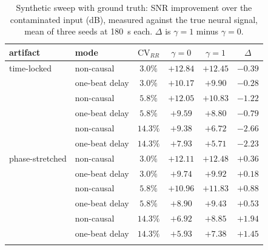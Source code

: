 \begin{table}[!ht]
\centering
\small
\caption{Synthetic sweep with ground truth: SNR improvement over the contaminated input
(dB), measured against the true neural signal, mean of three seeds at 180~s each.
$\Delta$ is $\gamma{=}1$ minus $\gamma{=}0$.}
\label{tab:synth}
\begin{tabular}{@{}llcccc@{}}
\toprule
artifact & mode & $\mathrm{CV}_{RR}$ & $\gamma{=}0$ & $\gamma{=}1$ & $\Delta$ \\
\midrule
time-locked & non-causal & $3.0\%$ & $+12.84$ & $+12.45$ & $-0.39$ \\
 & one-beat delay & $3.0\%$ & $+10.17$ & $+9.90$ & $-0.28$ \\
\addlinespace[2pt]
 & non-causal & $5.8\%$ & $+12.05$ & $+10.83$ & $-1.22$ \\
 & one-beat delay & $5.8\%$ & $+9.59$ & $+8.80$ & $-0.79$ \\
\addlinespace[2pt]
 & non-causal & $14.3\%$ & $+9.38$ & $+6.72$ & $-2.66$ \\
 & one-beat delay & $14.3\%$ & $+7.93$ & $+5.71$ & $-2.23$ \\
\addlinespace[2pt]
phase-stretched & non-causal & $3.0\%$ & $+12.11$ & $+12.48$ & $+0.36$ \\
 & one-beat delay & $3.0\%$ & $+9.74$ & $+9.92$ & $+0.18$ \\
\addlinespace[2pt]
 & non-causal & $5.8\%$ & $+10.96$ & $+11.83$ & $+0.88$ \\
 & one-beat delay & $5.8\%$ & $+8.90$ & $+9.43$ & $+0.53$ \\
\addlinespace[2pt]
 & non-causal & $14.3\%$ & $+6.92$ & $+8.85$ & $+1.94$ \\
 & one-beat delay & $14.3\%$ & $+5.93$ & $+7.38$ & $+1.45$ \\
\addlinespace[2pt]
\bottomrule
\end{tabular}
\end{table}
